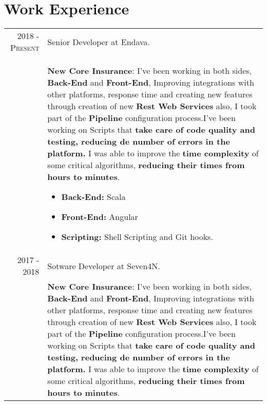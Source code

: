 \documentclass[a4paper,10pt]{article} %
\begin{document}
\section{Work Experience}

\begin{tabular}{r|p{11cm}}
\textsc{2018 - Present} & Senior Developer at Endava.\\
& \footnotesize{
 \textbf{New Core Insurance}: I've been working in both sides, \textbf{Back-End} and \textbf{Front-End}, Improving integrations with other platforms, response time and creating new features through creation of new \textbf{Rest Web Services} also, I took part of the \textbf{Pipeline} configuration process.\linebreak \linebreak I've been working on Scripts that \textbf{take care of code quality and testing, reducing de number of errors in the platform.} \linebreak \linebreak I was able to improve the \textbf{time complexity} of some critical algorithms, \textbf{reducing their times from hours to minutes}. \linebreak
\begin{itemize}
\item \textbf{Back-End:} Scala
\item \textbf{Front-End:} Angular
\item \textbf{Scripting:} Shell Scripting and Git hooks.
\end{itemize}}\\
\textsc{2017 - 2018} & Sotware Developer at Seven4N.\\
& \footnotesize{
 \textbf{New Core Insurance}: I've been working in both sides, \textbf{Back-End} and \textbf{Front-End}, Improving integrations with other platforms, response time and creating new features through creation of new \textbf{Rest Web Services} also, I took part of the \textbf{Pipeline} configuration process.\linebreak \linebreak I've been working on Scripts that \textbf{take care of code quality and testing, reducing de number of errors in the platform.} \linebreak \linebreak I was able to improve the \textbf{time complexity} of some critical algorithms, \textbf{reducing their times from hours to minutes}. \linebreak
}
\end{tabular}
\end{document}
